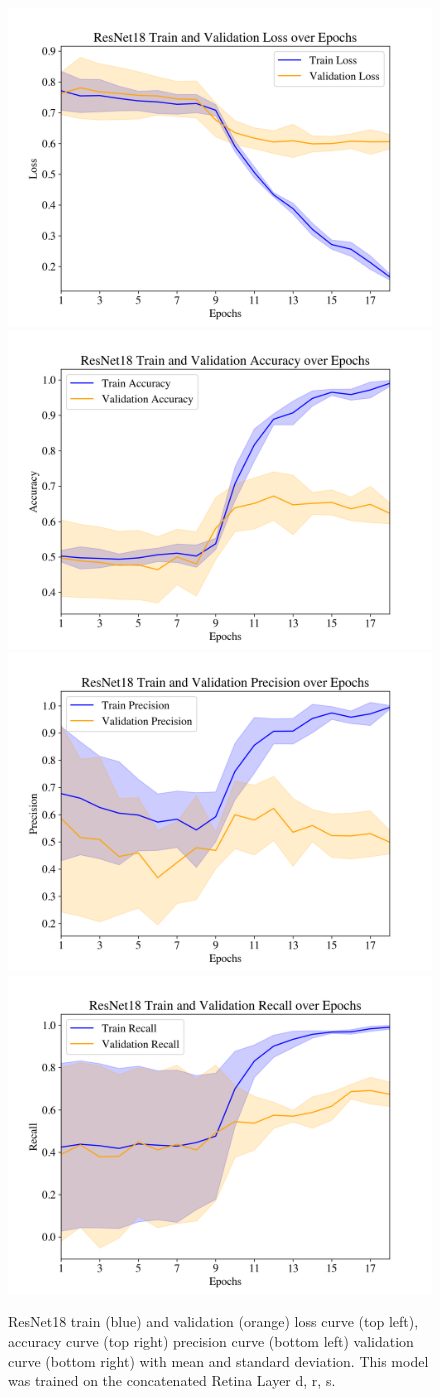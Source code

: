 \documentclass{article} %
\begin{document}
\begin{figure}[h]
\begin{center}
\includegraphics[width=.4\linewidth]{../3d/plots/resnet18/loss.png}
\includegraphics[width=.4\linewidth]{../3d/plots/resnet18/accuracy.png}
\includegraphics[width=.4\linewidth]{../3d/plots/resnet18/precision_score.png}
\includegraphics[width=.4\linewidth]{../3d/plots/resnet18/recall_score.png}
\end{center}
\caption{ResNet18 train (blue) and validation (orange) loss curve (top left), accuracy curve (top right) precision curve (bottom left) validation curve (bottom right) with mean and standard deviation. This model was trained on the concatenated Retina Layer d, r, s.}
\end{figure}
\end{document}
